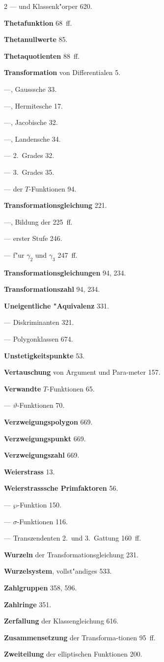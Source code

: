 \documentclass[12pt,a4paper]{article}
\begin{document}
\begin{multicols}{2}
--- und Klassenk"orper 620.

\textbf{Thetafunktion} 68~ff.

\textbf{Thetanullwerte} 85.

\textbf{Thetaquotienten} 88~ff.

\textbf{Transformation} von Differentialen 5.

---, Gausssche 33.

---, Hermitesche 17.

---, Jacobische 32.

---, Landensche 34.

--- 2.~Grades 32.

--- 3.~Grades 35.

--- der $T$-Funktionen 94.

\textbf{Transformationsgleichung} 221.

---, Bildung der 225~ff.

--- erster Stufe 246.

--- f"ur $\gamma_2$ und $\gamma_3$ 247~ff.

\textbf{Transformationsgleichungen} 94, 234.

\textbf{Transformationszahl} 94, 234.

\bigskip

\textbf{Uneigentliche "Aquivalenz} 331.

--- Diskriminanten 321.

--- Polygonklassen 674.

\textbf{Unstetigkeitspunkte} 53.

\bigskip

\textbf{Vertauschung} von Argument und Para{-}meter 157.

\textbf{Verwandte} $T$-Funktionen 65.

--- $\vartheta$-Funktionen 70.

\textbf{Verzweigungspolygon} 669.

\textbf{Verzweigungspunkt} 669.

\textbf{Verzweigungszahl} 669.

\bigskip

\textbf{Weierstrass} 13.

\textbf{Weierstrasssche Primfaktoren} 56.

--- $\wp$-Funktion 150.

--- $\sigma$-Funktionen 116.

--- Transzendenten 2.~und 3.~Gattung 160~ff.

\textbf{Wurzeln} der Transformationsgleichung 231.

\textbf{Wurzelsystem}, vollst"andiges 533.

\bigskip

\textbf{Zahlgruppen} 358, 596.

\textbf{Zahlringe} 351.

\textbf{Zerfallung} der Klassengleichung 616.

\textbf{Zusammensetzung} der Transforma{-}tionen 95~ff.

\textbf{Zweiteilung} der elliptischen Funktionen 200.

\end{multicols}
\end{document}
